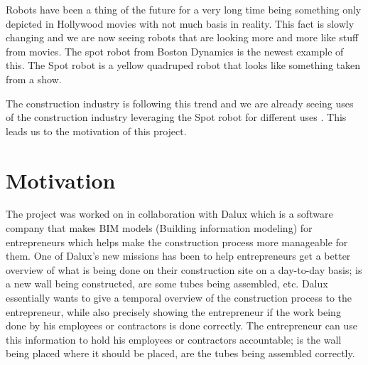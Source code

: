 Robots have been a thing of the future for a very long time being something only depicted in Hollywood movies with not much basis in reality. This fact is slowly changing and we are now seeing robots that are looking more and more like stuff from movies. 
The spot robot from Boston Dynamics is the newest example of this. The Spot robot is a yellow quadruped robot that looks like something taken from a show.\cite{black_mirror}

The construction industry is following this trend and we are already seeing uses of the construction industry leveraging the Spot robot for different uses \cite{spot_construction}. This leads us to the motivation of this project.

 



\section{Motivation}
The project was worked on in collaboration with Dalux which is a software company that makes BIM models (Building information modeling) for entrepreneurs which helps make the construction process more manageable for them. 
One of Dalux's new missions has been to help entrepreneurs get a better overview of what is being done on their construction site on a day-to-day basis; is a new wall being constructed, are some tubes being assembled, etc. 
Dalux essentially wants to give a temporal overview of the construction process to the entrepreneur, while also precisely showing the entrepreneur if the work being done by his employees or contractors is done correctly.
The entrepreneur can use this information to hold his employees or contractors accountable; is the wall being placed where it should be placed, are the tubes being assembled correctly.

